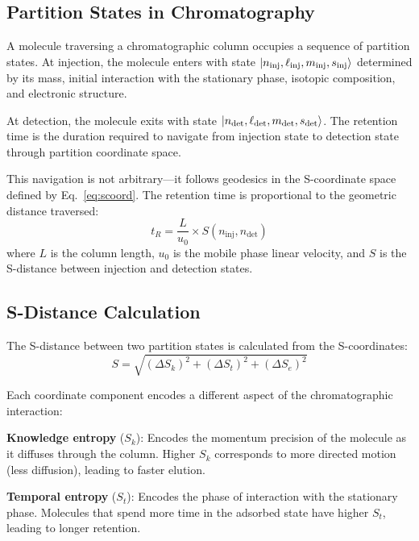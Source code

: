 \documentclass[twocolumn,superscriptaddress,prb,10pt]{revtex4-2}
\begin{document}
\subsection{Partition States in Chromatography}

A molecule traversing a chromatographic column occupies a sequence of partition states. At injection, the molecule enters with state $\ket{n_{\text{inj}}, \ell_{\text{inj}}, m_{\text{inj}}, s_{\text{inj}}}$ determined by its mass, initial interaction with the stationary phase, isotopic composition, and electronic structure.

At detection, the molecule exits with state $\ket{n_{\text{det}}, \ell_{\text{det}}, m_{\text{det}}, s_{\text{det}}}$. The retention time is the duration required to navigate from injection state to detection state through partition coordinate space.

This navigation is not arbitrary—it follows geodesics in the S-coordinate space defined by Eq.~\ref{eq:scoord}. The retention time is proportional to the geometric distance traversed:
\begin{equation}
t_R = \frac{L}{u_0} \times S(n_{\text{inj}}, n_{\text{det}})
\label{eq:retention_geometric}
\end{equation}
where $L$ is the column length, $u_0$ is the mobile phase linear velocity, and $S$ is the S-distance between injection and detection states.

\subsection{S-Distance Calculation}

The S-distance between two partition states is calculated from the S-coordinates:
\begin{equation}
S = \sqrt{(\Delta S_k)^2 + (\Delta S_t)^2 + (\Delta S_e)^2}
\label{eq:sdist_chrom}
\end{equation}

Each coordinate component encodes a different aspect of the chromatographic interaction:

\textbf{Knowledge entropy} ($S_k$): Encodes the momentum precision of the molecule as it diffuses through the column. Higher $S_k$ corresponds to more directed motion (less diffusion), leading to faster elution.

\textbf{Temporal entropy} ($S_t$): Encodes the phase of interaction with the stationary phase. Molecules that spend more time in the adsorbed state have higher $S_t$, leading to longer retention.
\end{document}
